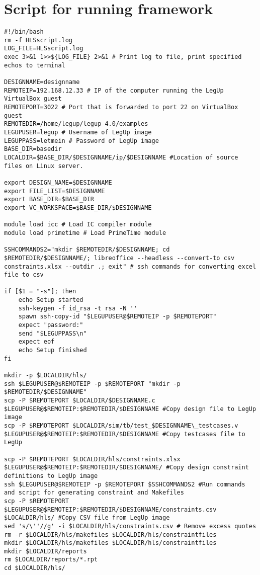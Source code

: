 \section{\label{sec:hlsscriptsourcecode}Script for running framework}
\lstset{language=[gnu] make, style=Cstyle, morestring=[s]""}
\begin{lstlisting}[caption={HLS Script source code},label=lst:hlsscriptsourcecode]
#!/bin/bash
rm -f HLSscript.log
LOG_FILE=HLSscript.log
exec 3>&1 1>>${LOG_FILE} 2>&1 # Print log to file, print specified echos to terminal

DESIGNNAME=designname
REMOTEIP=192.168.12.33 # IP of the computer running the LegUp VirtualBox guest
REMOTEPORT=3022 # Port that is forwarded to port 22 on VirtualBox guest
REMOTEDIR=/home/legup/legup-4.0/examples
LEGUPUSER=legup # Username of LegUp image
LEGUPPASS=letmein # Password of LegUp image
BASE_DIR=basedir
LOCALDIR=$BASE_DIR/$DESIGNNAME/ip/$DESIGNNAME #Location of source files on Linux server.

export DESIGN_NAME=$DESIGNNAME
export FILE_LIST=$DESIGNNAME
export BASE_DIR=$BASE_DIR
export VC_WORKSPACE=$BASE_DIR/$DESIGNNAME

module load icc # Load IC compiler module
module load primetime # Load PrimeTime module

SSHCOMMANDS2="mkdir $REMOTEDIR/$DESIGNNAME; cd $REMOTEDIR/$DESIGNNAME/; libreoffice --headless --convert-to csv constraints.xlsx --outdir .; exit" # ssh commands for converting excel file to csv

if [$1 = "-s"]; then
	echo Setup started
	ssh-keygen -f id_rsa -t rsa -N ''
	spawn ssh-copy-id "$LEGUPUSER@$REMOTEIP -p $REMOTEPORT"
	expect "password:"
	send "$LEGUPPASS\n"
	expect eof
	echo Setup finished
fi

mkdir -p $LOCALDIR/hls/
ssh $LEGUPUSER@$REMOTEIP -p $REMOTEPORT "mkdir -p $REMOTEDIR/$DESIGNNAME"
scp -P $REMOTEPORT $LOCALDIR/$DESIGNNAME.c $LEGUPUSER@$REMOTEIP:$REMOTEDIR/$DESIGNNAME #Copy design file to LegUp image
scp -P $REMOTEPORT $LOCALDIR/sim/tb/test_$DESIGNNAME\_testcases.v $LEGUPUSER@$REMOTEIP:$REMOTEDIR/$DESIGNNAME #Copy testcases file to LegUp

scp -P $REMOTEPORT $LOCALDIR/hls/constraints.xlsx $LEGUPUSER@$REMOTEIP:$REMOTEDIR/$DESIGNNAME/ #Copy design constraint definitions to LegUp image
ssh $LEGUPUSER@$REMOTEIP -p $REMOTEPORT $SSHCOMMANDS2 #Run commands and script for generating constraint and Makefiles
scp -P $REMOTEPORT $LEGUPUSER@$REMOTEIP:$REMOTEDIR/$DESIGNNAME/constraints.csv $LOCALDIR/hls/ #Copy CSV file from LegUp image
sed 's/\''//g' -i $LOCALDIR/hls/constraints.csv # Remove excess quotes
rm -r $LOCALDIR/hls/makefiles $LOCALDIR/hls/constraintfiles
mkdir $LOCALDIR/hls/makefiles $LOCALDIR/hls/constraintfiles
mkdir $LOCALDIR/reports
rm $LOCALDIR/reports/*.rpt
cd $LOCALDIR/hls/


\end{lstlisting}
